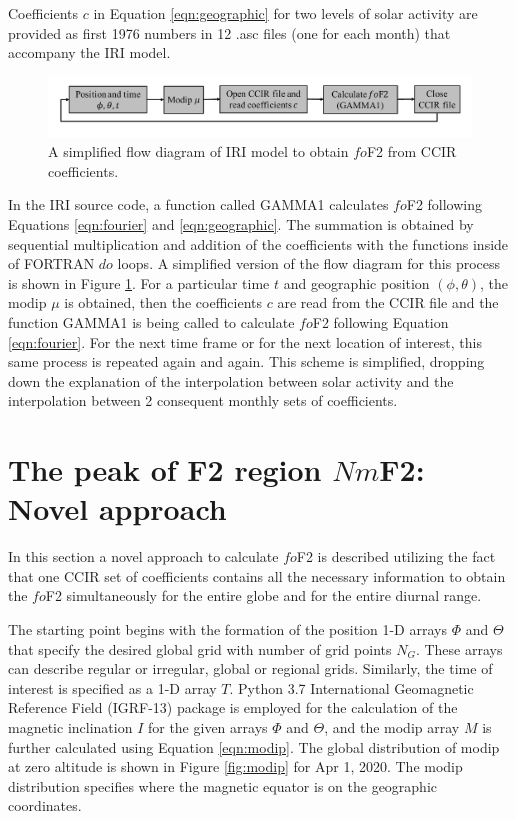 \documentclass[draft]{agujournal2019}
\begin{document}
Coefficients $c$ in Equation \ref{eqn:geographic} for two levels of solar activity are provided as first 1976 numbers in 12 .asc files (one for each month) that accompany the IRI model. 

\begin{figure}[H]
  \includegraphics[scale=0.4]{IRI_flow.pdf}
  \caption{A simplified flow diagram of IRI model to obtain $fo$F2 from CCIR coefficients.}
  \label{fig:IRI_flow}
\end{figure}

In the IRI source code, a function called GAMMA1 calculates $fo$F2 following Equations \ref{eqn:fourier} and \ref{eqn:geographic}. The summation is obtained by sequential multiplication and addition of the coefficients with the functions inside of FORTRAN $do$ loops. A simplified version of the flow diagram for this process is shown in Figure \ref{fig:IRI_flow}. For a particular time $t$ and geographic position $(\phi, \theta)$, the modip $\mu$ is obtained, then the coefficients $c$ are read from the CCIR file and the function GAMMA1 is being called to calculate $fo$F2 following Equation \ref{eqn:fourier}. For the next time frame or for the next location of interest, this same process is repeated again and again. This scheme is simplified, dropping down the explanation of the interpolation between solar activity and the interpolation between 2 consequent monthly sets of coefficients. 

\section{The peak of F2 region $Nm$F2: Novel approach}\label{sec:F2}

In this section a novel approach to calculate $fo$F2 is described utilizing the fact that one CCIR set of coefficients contains all the necessary information to obtain the $fo$F2 simultaneously for the entire globe and for the entire diurnal range. 

The starting point begins with the formation of the position 1-D arrays $\Phi$ and $\Theta$ that specify the desired global grid with number of grid points $N_G$. These arrays can describe regular or irregular, global or regional grids. Similarly, the time of interest is specified as a 1-D array $T$. Python 3.7 International Geomagnetic Reference Field (IGRF-13) package \cite{Alk21} is employed for the calculation of the magnetic inclination $I$ for the given arrays $\Phi$ and $\Theta$, and the modip array $M$ is further calculated using Equation \ref{eqn:modip}.  
The global distribution of modip at zero altitude is shown in Figure \ref{fig:modip} for Apr 1, 2020. The modip distribution specifies where the magnetic equator is on the geographic coordinates. 
\end{document}
